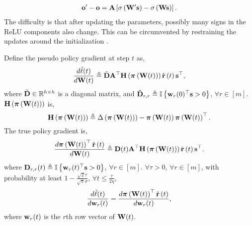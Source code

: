 \begin{equation*}
\begin{split}
    {\mathbf{o}}^\prime - {\mathbf{o}} = {\mathbf{A}} \left[ \sigma \left( {\mathbf{W}}^\prime {\mathbf{s}} \right) - \sigma \left( {\mathbf{W}} {\mathbf{s}} \right) \right].
\end{split}
\end{equation*}
The difficulty is that after updating the parameters, possibly many signs in the ReLU components also change. This can be circumvented by restraining the updates around the initialization \citep{li2018learning}.

\begin{lem}
\label{lem:gradient_coupling}
	Define the pseudo policy gradient at step $t$ as,
\begin{equation*}
\begin{split}
	\frac{d \tilde{\ell}(t)}{d {\mathbf{W}}(t)} \triangleq \tilde{{\mathbf{D}}} {\mathbf{A}}^\top {\mathbf{H}}\left( {\boldsymbol{\pi}}\left({\mathbf{W}}(t)\right) \right) \hat{{\mathbf{r}}}\left(t\right) {\mathbf{s}}^\top,
\end{split}
\end{equation*}
where $\tilde{{\mathbf{D}}} \in {\mathbb{R}}^{h \times h}$ is a diagonal matrix, and  $\tilde{{\mathbf{D}}}_{r,r} \triangleq {\mathbb{I}}\left\{ {\mathbf{w}}_r(0)^\top {\mathbf{s}} > 0 \right\}$, $\forall r \in [m]$. ${\mathbf{H}}\left( {\boldsymbol{\pi}}\left({\mathbf{W}}(t)\right) \right)$ is,
\begin{equation*}
    {\mathbf{H}}\left( {\boldsymbol{\pi}}\left({\mathbf{W}}(t)\right) \right) \triangleq \Delta\left( {\boldsymbol{\pi}}\left({\mathbf{W}}(t)\right) \right) - {\boldsymbol{\pi}}\left({\mathbf{W}}(t)\right) {\boldsymbol{\pi}}\left({\mathbf{W}}(t)\right)^\top.
\end{equation*}
The true policy gradient is,
\begin{equation*}
\begin{split}
    \frac{d {\boldsymbol{\pi}}\left({\mathbf{W}}(t)\right)^\top \hat{{\mathbf{r}}}\left(t\right)}{d {\mathbf{W}}(t)} \triangleq  {\mathbf{D}}(t) {\mathbf{A}}^\top {\mathbf{H}}\left( {\boldsymbol{\pi}}\left({\mathbf{W}}(t)\right) \right) \hat{{\mathbf{r}}}\left(t\right) {\mathbf{s}}^\top.
\end{split}
\end{equation*}
where ${\mathbf{D}}_{r,r}(t) \triangleq {\mathbb{I}}\left\{ {\mathbf{w}}_r(t)^\top {\mathbf{s}} > 0 \right\}$, $\forall r \in [m]$. $\forall \tau > 0$, $\forall r \in [m]$, with probability at least $1 - \frac{\sqrt{2}\tau}{\sqrt{\pi}\sigma}$, $\forall t \le \frac{\tau}{ 2 \eta }$,
\begin{equation*}
	\frac{d\tilde{\ell}(t)}{d {\mathbf{w}}_r(t)} = \frac{d {\boldsymbol{\pi}}\left({\mathbf{W}}(t)\right)^\top \hat{{\mathbf{r}}}\left(t\right)}{d {\mathbf{w}}_r(t)},
\end{equation*}
where ${\mathbf{w}}_r(t)$ is the $r$th row vector of ${\mathbf{W}}(t)$.
\end{lem}

